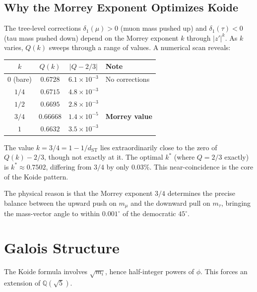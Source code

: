 \documentclass[12pt,a4paper]{article}
\theoremstyle{definition}
\begin{document}
\subsection{Why the Morrey Exponent Optimizes Koide}

The tree-level corrections $\delta_1(\mu) > 0$ (muon mass pushed up) and $\delta_1(\tau) < 0$ (tau mass pushed down) depend on the Morrey exponent $k$ through $|z'|^k$.  As $k$ varies, $Q(k)$ sweeps through a range of values.  A numerical scan reveals:

\begin{center}
\begin{tabular}{cccl}
\toprule
$k$ & $Q(k)$ & $|Q - 2/3|$ & Note \\
\midrule
$0$ (bare) & $0.6728$ & $6.1 \times 10^{-3}$ & No corrections \\
$1/4$ & $0.6715$ & $4.8 \times 10^{-3}$ & \\
$1/2$ & $0.6695$ & $2.8 \times 10^{-3}$ & \\
$3/4$ & $0.66668$ & $1.4 \times 10^{-5}$ & \textbf{Morrey value} \\
$1$ & $0.6632$ & $3.5 \times 10^{-3}$ & \\
\bottomrule
\end{tabular}
\end{center}

The value $k = 3/4 = 1 - 1/d_{\mathrm{ST}}$ lies extraordinarily close to the zero of $Q(k) - 2/3$, though not exactly at it.  The optimal $k^*$ (where $Q = 2/3$ exactly) is $k^* \approx 0.7502$, differing from $3/4$ by only $0.03\%$.  This near-coincidence is the core of the Koide pattern.

The physical reason is that the Morrey exponent $3/4$ determines the precise balance between the upward push on $m_\mu$ and the downward pull on $m_\tau$, bringing the mass-vector angle to within $0.001^\circ$ of the democratic $45^\circ$.

\section{Galois Structure}
\label{sec:galois}

The Koide formula involves $\sqrt{m_i}$, hence half-integer powers of $\phi$.  This forces an extension of $\mathbb{Q}(\sqrt{5})$.
\end{document}
